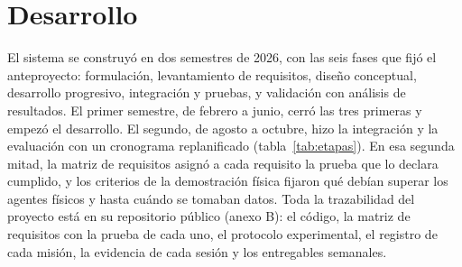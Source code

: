 %
\chapter{Desarrollo}
\label{cap:desarrollo}

El sistema se construyó en dos semestres de 2026, con las seis fases que fijó el
anteproyecto: formulación, levantamiento de requisitos, diseño conceptual,
desarrollo progresivo, integración y pruebas, y validación con análisis de
resultados. El primer semestre, de febrero a junio, cerró las tres primeras y
empezó el desarrollo. El segundo, de agosto a octubre, hizo la integración y la evaluación con un cronograma replanificado (tabla~\ref{tab:etapas}). En esa segunda mitad, la matriz de requisitos asignó a
cada requisito la prueba que lo declara cumplido, y los criterios de la demostración física fijaron qué debían superar los agentes físicos y hasta cuándo se tomaban datos. Toda la trazabilidad del proyecto está en su repositorio público (anexo B): el código, la matriz de requisitos con la prueba de cada uno, el protocolo experimental, el registro de cada misión, la evidencia de cada sesión y los entregables semanales.

